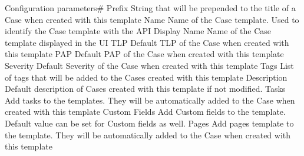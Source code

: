 Configuration parameters#
Prefix
String that will be prepended to the title of a Case when created with this template
Name
Name of the Case template. Used to identify the Case template with the API
Display Name
Name of the Case template displayed in the UI
TLP
Default TLP of the Case when created with this template
PAP
Default PAP of the Case when created with this template
Severity
Default Severity of the Case when created with this template
Tags
List of tags that will be added to the Cases created with this template
Description
Default description of Cases created with this template if not modified.
Tasks
Add tasks to the templates. They will be automatically added to the Case when created with this template
Custom Fields
Add Custom fields to the template. Default value can be set for Custom fields as well.
Pages
Add pages template to the template. They will be automatically added to the Case when created with this template



